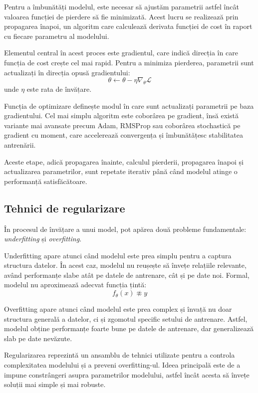 Pentru a îmbunătăți modelul, este necesar să ajustăm parametrii astfel încât valoarea funcției de pierdere să fie minimizată. Acest lucru se realizează prin propagarea înapoi, un algoritm care calculează derivata funcției de cost în raport cu fiecare parametru al modelului.

Elementul central în acest proces este gradientul, care indică direcția în care funcția de cost crește cel mai rapid. Pentru a minimiza pierderea, parametrii sunt actualizați în direcția opusă gradientului:
\[
\theta \leftarrow \theta - \eta \nabla_\theta \mathcal{L}
\]
unde \( \eta \) este rata de învățare.

Funcția de optimizare definește modul în care sunt actualizați parametrii pe baza gradientului. Cel mai simplu algoritm este coborârea pe gradient, însă există variante mai avansate precum Adam, RMSProp sau coborârea stochastică pe gradient cu moment, care accelerează convergența și îmbunătățesc stabilitatea antrenării.

Aceste etape, adică propagarea înainte, calculul pierderii, propagarea înapoi și actualizarea parametrilor, sunt repetate iterativ până când modelul atinge o performanță satisfăcătoare.

\subsection*{Tehnici de regularizare}

În procesul de învățare a unui model, pot apărea două probleme fundamentale: \textit{underfitting} și \textit{overfitting}.

Underfitting apare atunci când modelul este prea simplu pentru a captura structura datelor. În acest caz, modelul nu reușește să învețe relațiile relevante, având performanțe slabe atât pe datele de antrenare, cât și pe date noi. Formal, modelul nu aproximează adecvat funcția țintă:
\[
    f_\theta(x) \not\approx y
\]

Overfitting apare atunci când modelul este prea complex și învață nu doar structura generală a datelor, ci și zgomotul specific setului de antrenare. Astfel, modelul obține performanțe foarte bune pe datele de antrenare, dar generalizează slab pe date nevăzute.

Regularizarea reprezintă un ansamblu de tehnici utilizate pentru a controla complexitatea modelului și a preveni overfitting-ul. Ideea principală este de a impune constrângeri asupra parametrilor modelului, astfel încât acesta să învețe soluții mai simple și mai robuste.

